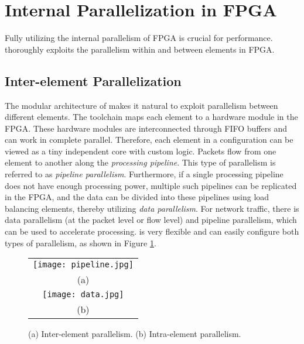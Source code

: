 \section{Internal Parallelization in FPGA}
\label{clicknp:sec:optimization}

Fully utilizing the internal parallelism of FPGA is crucial for performance.
\name thoroughly exploits the parallelism within and between elements in FPGA.

\subsection{Inter-element Parallelization}
The modular architecture of \name makes it natural to exploit parallelism between different elements.
The \name toolchain maps each element to a hardware module in the FPGA.
These hardware modules are interconnected through FIFO buffers and can work in complete parallel.
Therefore, each element in a \name configuration can be viewed as a tiny independent core with custom logic.
Packets flow from one element to another along the \textit{processing pipeline}.
This type of parallelism is referred to as \textit{pipeline parallelism}.
Furthermore, if a single processing pipeline does not have enough processing power, multiple such pipelines can be replicated in the FPGA, and the data can be divided into these pipelines using load balancing elements, thereby utilizing \textit{data parallelism}.
For network traffic, there is data parallelism (at the packet level or flow level) and pipeline parallelism, which can be used to accelerate processing.
\name is very flexible and can easily configure both types of parallelism, as shown in Figure \ref{clicknp:fig:element-para}.

\begin{figure}
\centering
\begin{tabular}{c}
\texttt{[image: pipeline.jpg]}\\
(a)\\
\texttt{[image: data.jpg]}\\
(b)\\
\end{tabular}
\caption{(a) Inter-element parallelism. (b) Intra-element parallelism.}
\label{clicknp:fig:element-para}
\end{figure}

